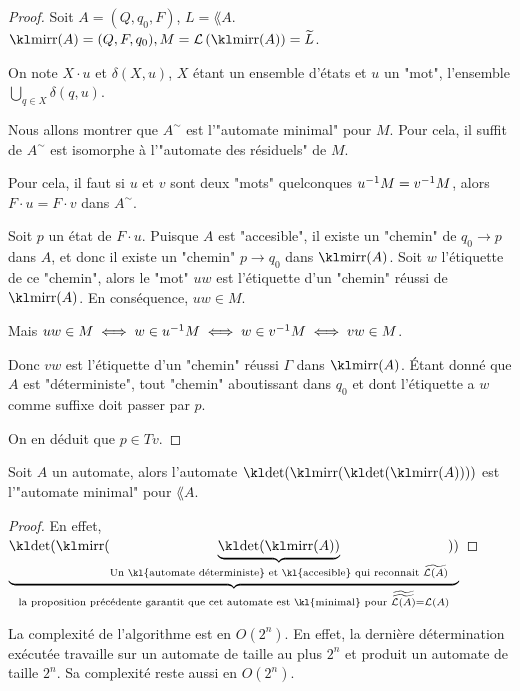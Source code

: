\begin{proof}
	Soit $A = (Q, q_0, F)$, $L = \lang A$. $\mirr (A) = (Q, F, q_0), M = \lang {\mirr (A)} = \mirror L$.

	On note $X \cdot u$ et $\delta (X,u)$, $X$ étant un ensemble d'états et $u$ un "mot", l'ensemble $\bigcup\limits_{q \in X} \delta (q,u)$.

	Nous allons montrer que $A^{\sim}$ est l'"automate minimal" pour $M$. Pour cela, il suffit de \mq $A^{\sim}$
	est isomorphe à l'"automate des résiduels" de $M$.

	Pour cela, il faut \mq si $u$ et $v$ sont deux "mots" quelconques \tq $u^{-1} M = v^{-1} M$, alors $F \cdot u =  F \cdot v$ dans $A^{\sim}$.

	Soit $p$ un état de $F \cdot u$. Puisque $A$ est "accesible", il existe un "chemin" de $q_0 \to p$ dans $A$, et donc il existe un "chemin" $p \to q_0$ dans $\mirr(A)$.
	Soit $w$ l'étiquette de ce "chemin", alors le "mot" $uw$ est l'étiquette d'un "chemin" réussi de $\mirr (A)$. En conséquence, $uw \in M$.

	Mais $uw\in M \iff w \in u^{-1} M \iff w\in v^{-1} M \iff vw \in M$.

	Donc $vw$ est l'étiquette d'un "chemin" réussi $\Gamma$ dans $\mirr (A)$. Étant donné que $A$ est "déterministe", tout "chemin" aboutissant dans $q_0$
	et dont l'étiquette a $w$ comme suffixe doit passer par $p$.

	On en  déduit que $p \in Tv$.
\end{proof}


\begin{coro}
	Soit $A$ un automate, alors l'automate $\detA (\mirr (\detA(\mirr (A))))$ est l'"automate minimal" pour $\lang A$.
\end{coro}

\begin{proof}
	En effet,
	$\underbrace{\detA (\mirr (
			\underbrace{\detA(\mirr (A))}_{\text{Un \kl{automate déterministe} et \kl{accesible} qui reconnait }\mirror {\lang A}}
			))}_{\text{la proposition précédente garantit que cet automate est \kl{minimal} pour }  \mirror{\mirror {\lang A} } = \lang A} $
\end{proof}

\begin{complexite}
	La complexité de l'algorithme est en $O(2^n)$. En effet, la dernière détermination exécutée travaille sur un automate de taille au plus $2^n$
	et produit un automate de taille $2^n$. Sa complexité reste aussi en $O(2^n)$.
\end{complexite}


